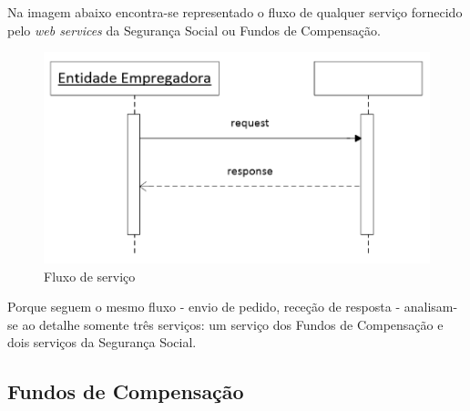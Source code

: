 \documentclass[sigplan]{acmart}
\begin{document}
Na imagem abaixo encontra-se representado o fluxo de qualquer serviço fornecido pelo \textit{web services} da Segurança Social ou Fundos de Compensação.
\FloatBarrier
\begin{figure}[htbp]
	\centerline{\includegraphics[width=\linewidth]{figures/fluxo_servicos.png}}
	\caption{Fluxo de serviço}
	\label{fig3}
\end{figure}
\FloatBarrier
Porque seguem o mesmo fluxo - envio de pedido, receção de resposta - analisam-se ao detalhe somente três serviços: um serviço dos Fundos de Compensação e dois serviços da Segurança Social.

\subsection{Fundos de Compensação}
\end{document}
